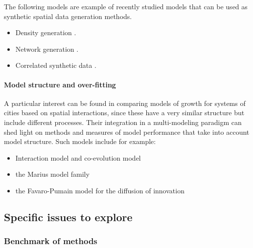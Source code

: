 The following models are example of recently studied models that can be used as synthetic spatial data generation methods.

\begin{itemize}
\item Density generation \cite{raimbault2017calibration}.
\item Network generation \cite{raimbault2018urban}.
\item Correlated synthetic data \cite{raimbault2016generation}.
\end{itemize}


\paragraph{Model structure and over-fitting}

A particular interest can be found in comparing models of growth for systems of cities based on spatial interactions, since these have a very similar structure but include different processes. Their integration in a multi-modeling paradigm can shed light on methods and measures of model performance that take into account model structure. Such models include for example:

\begin{itemize}
\item Interaction model \cite{raimbault2016generation} and co-evolution model \cite{raimbault2018models}
\item the Marius model family \cite{cottineau2015modular}
\item the Favaro-Pumain model for the diffusion of innovation \cite{favaro2011gibrat} 
\end{itemize}






\subsection{Specific issues to explore}

\subsubsection{Benchmark of methods}

